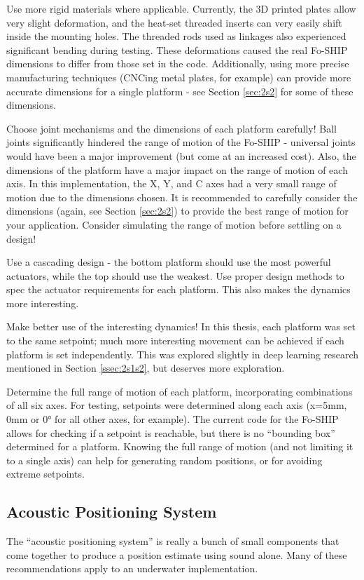 \documentclass[12pt,a4paper]{report}
\begin{document}
Use more rigid materials where applicable. Currently, the 3D printed plates allow very slight deformation, and the heat-set threaded inserts can very easily shift inside the mounting holes. The threaded rods used as linkages also experienced significant bending during testing. These deformations caused the real Fo-SHIP dimensions to differ from those set in the code. Additionally, using more precise manufacturing techniques (CNCing metal plates, for example) can provide more accurate dimensions for a single platform - see Section \ref{sec:2s2} for some of these dimensions.

Choose joint mechanisms and the dimensions of each platform carefully! Ball joints significantly hindered the range of motion of the Fo-SHIP - universal joints would have been a major improvement (but come at an increased cost). Also, the dimensions of the platform have a major impact on the range of motion of each axis. In this implementation, the X, Y, and C axes had a very small range of motion due to the dimensions chosen. It is recommended to carefully consider the dimensions (again, see Section \ref{sec:2s2}) to provide the best range of motion for your application. Consider simulating the range of motion before settling on a design!

Use a cascading design - the bottom platform should use the most powerful actuators, while the top should use the weakest. Use proper design methods to spec the actuator requirements for each platform. This also makes the dynamics more interesting.

Make better use of the interesting dynamics! In this thesis, each platform was set to the same setpoint; much more interesting movement can be achieved if each platform is set independently. This was explored slightly in deep learning research mentioned in Section \ref{ssec:2s1s2}, but deserves more exploration.

Determine the full range of motion of each platform, incorporating combinations of all six axes. For testing, setpoints were determined along each axis (x=5mm, 0mm or 0° for all other axes, for example). The current code for the Fo-SHIP allows for checking if a setpoint is reachable, but there is no “bounding box” determined for a platform. Knowing the full range of motion (and not limiting it to a single axis) can help for generating random positions, or for avoiding extreme setpoints.

\subsection{Acoustic Positioning System} \label{sec:7s1s2}
The “acoustic positioning system” is really a bunch of small components that come together to produce a position estimate using sound alone. Many of these recommendations apply to an underwater implementation.
\end{document}
